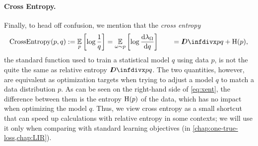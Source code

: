 \paragraph{Cross Entropy.}
Finally, to head off confusion, we mention that the \emph{cross entropy}
\begin{equation}
    \XEnt(p,q) := \Ex_{p} \left[\log\frac{1}{q}\right]
         = \Ex_{\omega \sim p}\left[\log\frac{\mathrm d\lambda_{\Omega}}{\mathrm d q} \right]
         \qquad = \kldiv pq + \H(p),
         \label{eqn:xent}
\end{equation}
the standard function used to train a statistical model $q$ using data $p$, is not the quite the same as relative entropy $\kldiv pq$.
The two quantities, however, are equivalent as optimization targets when trying to adjust a model $q$ to match a data distribution $p$.
As can be seen on the right-hand side of \eqref{eq:xent}, the difference between them is the entropy $\operatorname{\mathrm{H}}(p)$ of the data, which has no impact when optimizing the model $q$. 
Thus, we view cross entropy as a small shortcut that can speed up calculations with relative entropy in some contexts; we will use it only when comparing with standard learning objectives (in \cref{chap:one-true-loss,chap:LIR}).


